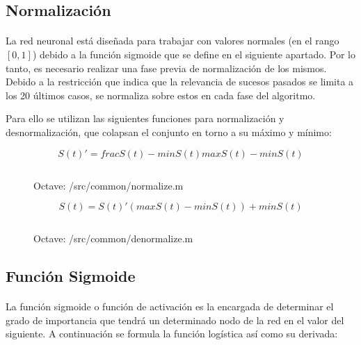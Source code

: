 \documentclass[10pt, a4paper,spanish]{article}
\begin{document}
		\subsection{Normalización}

			\paragraph{}
			La red neuronal está diseñada para trabajar con valores normales (en el rango $[0,1]$) debido a la función sigmoide que se define en el siguiente apartado. Por lo tanto, es necesario realizar una fase previa de normalización de los mismos. Debido a la restricción que indica que la relevancia de sucesos pasados se limita a los 20 últimos casos, se normaliza sobre estos en cada fase del algoritmo.

			Para ello se utilizan las siguientes funciones para normalización y desnormalización, que colapsan el conjunto en torno a su máximo y mínimo:

			\begin{equation}
				S(t)' = frac{S(t) - min S(t)}{max S(t)- min S(t)}
			\end{equation}

			\begin{figure}[htpb!]
				\centering
				\inputminted{octave}{../src/common/normalize.m}
				\caption{Octave: /src/common/normalize.m}
				\label{code:normalize}
			\end{figure}


			\begin{equation}
				S(t) = S(t)' (max S(t)- min S(t)) + min S(t)
			\end{equation}

			\begin{figure}[htpb!]
				\centering
				\inputminted{octave}{../src/common/denormalize.m}
				\caption{Octave: /src/common/denormalize.m}
				\label{code:denormalize}
			\end{figure}

		\subsection{Función Sigmoide}
			\paragraph{}
			La función sigmoide o función de activación es la encargada de determinar el grado de importancia que tendrá un determinado nodo de la red en el valor del siguiente. A continuación se formula la función logística así como su derivada:
\end{document}
